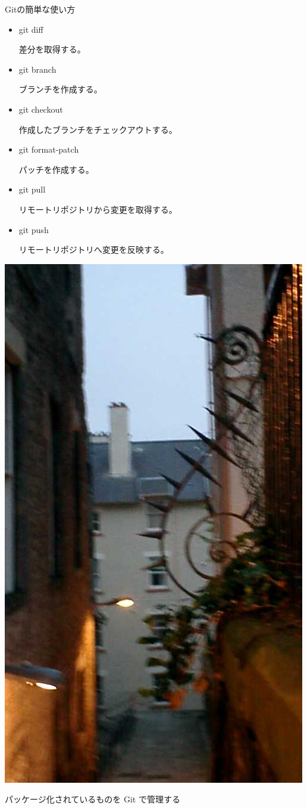 \documentclass[cjk,dvipdfmx,12pt]{beamer}
\newcommand{\emtext}[1]{
\begin{frame}{}
 
\begin{minipage}{0.55\hsize}
\includegraphics[width=1\hsize]{image200707/gurutitle.jpg}
\end{minipage}
\begin{minipage}{0.39\hsize}
 {\Huge #1
 }
\end{minipage}
\end{frame}
}
\begin{document}
\begin{frame}{Gitの簡単な使い方}
   \begin{itemize}
   \item git diff

差分を取得する。\\
\item git branch

ブランチを作成する。\\
\item git checkout

作成したブランチをチェックアウトする。\\
\item git format-patch

パッチを作成する。\\

\item git pull

リモートリポジトリから変更を取得する。\\

\item git push

リモートリポジトリへ変更を反映する。\\
\end{itemize}
\end{frame}

\emtext{パッケージ化されているものを Git で管理する}
\end{document}
